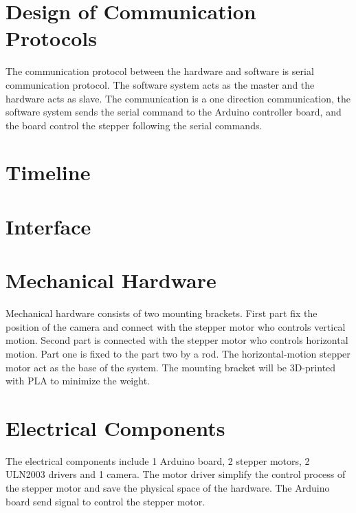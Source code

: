 \documentclass[12pt, titlepage]{article}
\begin{document}
\section{Design of Communication Protocols}


The communication protocol between the hardware and software is serial communication protocol. The software system acts as the master and the hardware acts as slave. The communication is a one direction communication, the software system sends the serial command to the Arduino controller board, and the board control the stepper following the serial commands.
\section{Timeline}


% 

\newpage{}

\appendix

\section{Interface}


\section{Mechanical Hardware}
Mechanical hardware consists of two mounting brackets. First part fix the position of the camera and connect with the stepper motor who controls vertical motion. Second part is connected with the stepper motor who controls horizontal motion. Part one is fixed to the part two by a rod. The horizontal-motion stepper motor act as the base of the system. The mounting bracket will be 3D-printed with PLA to minimize the weight.

\section{Electrical Components}
The electrical components include 1 Arduino board, 2 stepper motors, 2 ULN2003 drivers and 1 camera. The motor driver simplify the control process of the stepper motor and save the physical space of the hardware. The Arduino board send signal to control the stepper motor.
\end{document}
